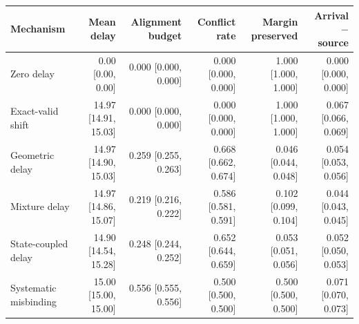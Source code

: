 \begin{tabular}{lrrrrr}
\toprule
Mechanism & Mean delay & Alignment budget & Conflict rate & Margin preserved & Arrival $-$ source \\
\midrule
Zero delay & 0.00 [0.00, 0.00] & 0.000 [0.000, 0.000] & 0.000 [0.000, 0.000] & 1.000 [1.000, 1.000] & 0.000 [0.000, 0.000] \\
Exact-valid shift & 14.97 [14.91, 15.03] & 0.000 [0.000, 0.000] & 0.000 [0.000, 0.000] & 1.000 [1.000, 1.000] & 0.067 [0.066, 0.069] \\
Geometric delay & 14.97 [14.90, 15.03] & 0.259 [0.255, 0.263] & 0.668 [0.662, 0.674] & 0.046 [0.044, 0.048] & 0.054 [0.053, 0.056] \\
Mixture delay & 14.97 [14.86, 15.07] & 0.219 [0.216, 0.222] & 0.586 [0.581, 0.591] & 0.102 [0.099, 0.104] & 0.044 [0.043, 0.045] \\
State-coupled delay & 14.90 [14.54, 15.28] & 0.248 [0.244, 0.252] & 0.652 [0.644, 0.659] & 0.053 [0.051, 0.056] & 0.052 [0.050, 0.053] \\
Systematic misbinding & 15.00 [15.00, 15.00] & 0.556 [0.555, 0.556] & 0.500 [0.500, 0.500] & 0.500 [0.500, 0.500] & 0.071 [0.070, 0.073] \\
\bottomrule
\end{tabular}
